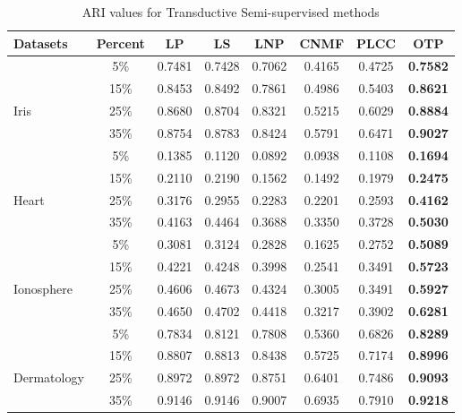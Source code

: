 \documentclass[conference]{IEEEtran}
\begin{document}
\begin{table}[h]
\caption{ARI values for Transductive Semi-supervised methods}
\small
\centering
\setlength\tabcolsep{1.3pt}
\setlength\extrarowheight{-2pt}
\begin{tabular}{lccccccc}
\hline
Datasets & Percent   & LP      & LS     & LNP   & CNMF & PLCC &  OTP  \\ \toprule

             & 5\%   & 0.7481  & 0.7428 &0.7062  &0.4165 &0.4725 &\textbf{0.7582} \\ 
             & 15\%  & 0.8453  & 0.8492 &0.7861  &0.4986 &0.5403 &\textbf{0.8621} \\ 
Iris         & 25\%  & 0.8680  & 0.8704 &0.8321  &0.5215 &0.6029 &\textbf{0.8884} \\ 
             & 35\%  & 0.8754  & 0.8783 &0.8424  &0.5791 &0.6471 &\textbf{0.9027} \\ 
             
             
            & 5\%   & 0.1385 & 0.1120 & 0.0892        &0.0938    &0.1108    &\textbf{0.1694} \\
            & 15\%  & 0.2110 & 0.2190 & 0.1562        &0.1492    &0.1979    &\textbf{0.2475} \\
Heart       & 25\%  & 0.3176 & 0.2955 & 0.2283        &0.2201    &0.2593    &\textbf{0.4162} \\
            & 35\%  & 0.4163 & 0.4464 & 0.3688        &0.3350    &0.3728    &\textbf{0.5030} \\ 
             
             & 5\%   & 0.3081  & 0.3124 &0.2828  &0.1625 &0.2752 &\textbf{0.5089}\\
             & 15\%  & 0.4221  & 0.4248 &0.3998  &0.2541 &0.3491 &\textbf{0.5723} \\ 
Ionosphere   & 25\%  & 0.4606  & 0.4673 &0.4324  &0.3005 &0.3491 &\textbf{0.5927}\\ 
             & 35\%  & 0.4650  & 0.4702 &0.4418  &0.3217 &0.3902 &\textbf{0.6281} \\ 
             
             & 5\%   & 0.7834  & 0.8121 & 0.7808 &0.5360 &0.6826 &\textbf{0.8289} \\ 
             & 15\%  & 0.8807  & 0.8813 & 0.8438 &0.5725 &0.7174 &\textbf{0.8996} \\ 
Dermatology  & 25\%  & 0.8972  & 0.8972 & 0.8751 &0.6401 &0.7486 &\textbf{0.9093}  \\                         
             & 35\%  & 0.9146  & 0.9146 & 0.9007 &0.6935 &0.7910 &\textbf{0.9218} \\  
             

\end{tabular}
\end{table}
\end{document}
